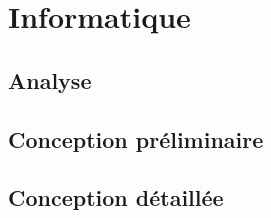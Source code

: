 \section{Informatique}
\subsection{Analyse}


\subsection{Conception préliminaire}



\subsection{Conception détaillée}





